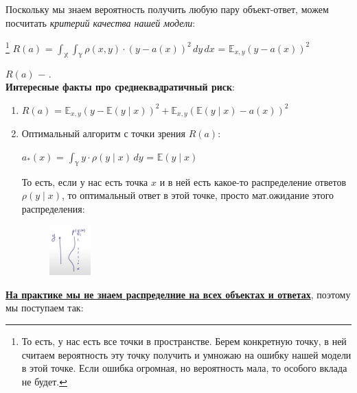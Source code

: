             Поскольку мы знаем вероятность получить любую пару объект-ответ, можем посчитать \textit{критерий качества нашей модели}:
            \begin{center}
            \large
            \footnote{То есть, у нас есть все точки в пространстве. Берем конкретную точку, в ней считаем вероятность эту точку получить и умножаю на ошибку нашей модели в этой точке. Если ошибка огромная, но вероятность мала, то особого вклада не будет.}
                $R(a)$ = $\int_{\mathbb{X}}\int_{\mathbb{Y}}\rho(x, y) \cdot (y - a(x))^2\, dy\, dx$ = $\mathbb{E}_{x, y}(y - a(x))^2$
            \end{center}
            
            $R(a)$ $-$ .\\

            \textbf{Интересные факты про среднеквадратичный риск}:
            \begin{enumerate}
                \item $R(a)$ = $\mathbb{E}_{x, y}(y - \mathbb{E}(y \mid x))^2 + \mathbb{E}_{x, y}(\mathbb{E}(y \mid x) - a(x))^2$

                \item Оптимальный алгоритм с точки зрения $R(a)$:
                    \begin{center}
                        $a_*(x)$ = $\int_{\mathbb{Y}}y \cdot \rho(y \mid x) \, dy$ = $\mathbb{E}(y \mid x)$
                    \end{center}

                    То есть, если у нас есть точка $x$ и в ней есть какое-то распределение ответов $\rho(y \mid x)$, то оптимальный ответ в этой точке, просто мат.ожидание этого распределения:
                    \begin{figure}[H]
                        \centering
                        \includegraphics[width=0.15\textwidth]{images/9lecture/fact2.png}
                    \end{figure}
                    
            \end{enumerate}

            \begin{center}
                \underline{\textbf{На практике мы не знаем распределние на всех объектах и ответах}},
                поэтому мы поступаем так:
            \end{center}

